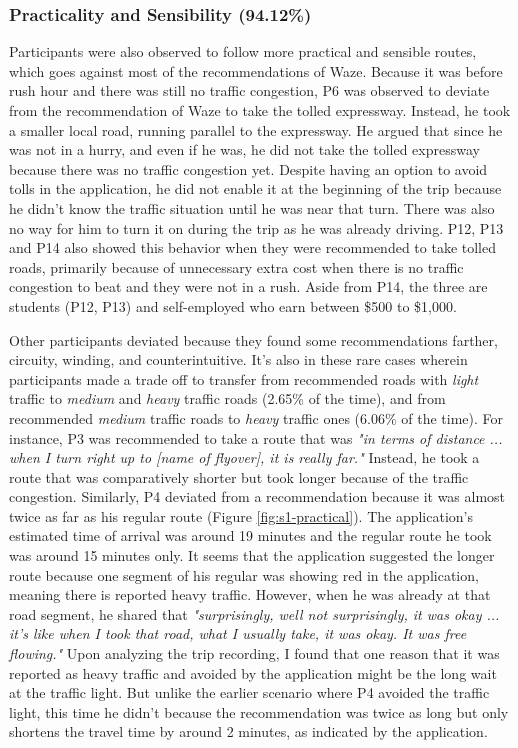 \subsubsection{Practicality and Sensibility (94.12\%)}
Participants were also observed to follow more practical and sensible routes, which goes against most of the recommendations of Waze. Because it was before rush hour and there was still no traffic congestion, P6 was observed to deviate from the recommendation of Waze to take the tolled expressway. Instead, he took a smaller local road, running parallel to the expressway. He argued that since he was not in a hurry, and even if he was, he did not take the tolled expressway because there was no traffic congestion yet. Despite having an option to avoid tolls in the application, he did not enable it at the beginning of the trip because he didn't know the traffic situation until he was near that turn. There was also no way for him to turn it on during the trip as he was already driving. P12, P13 and P14 also showed this behavior when they were recommended to take tolled roads, primarily because of unnecessary extra cost when there is no traffic congestion to beat and they were not in a rush. Aside from P14, the three are students (P12, P13) and self-employed who earn between \$500 to \$1,000.

Other participants deviated because they found some recommendations farther, circuity, winding, and counterintuitive. It's also in these rare cases wherein participants made a trade off to transfer from recommended roads with \emph{light} traffic to \emph{medium} and \emph{heavy} traffic roads (2.65\% of the time), and from recommended \emph{medium} traffic roads to \emph{heavy} traffic ones (6.06\% of the time). For instance, P3 was recommended to take a route that was \emph{"in terms of distance ... when I turn right up to [name of flyover], it is really far."} Instead, he took a route that was comparatively shorter but took longer because of the traffic congestion. Similarly, P4 deviated from a recommendation because it was almost twice as far as his regular route (Figure \ref{fig:s1-practical}). The application's estimated time of arrival was around 19 minutes and the regular route he took was around 15 minutes only. It seems that the application suggested the longer route because one segment of his regular was showing red in the application, meaning there is reported heavy traffic. However, when he was already at that road segment, he shared that \emph{"surprisingly, well not surprisingly, it was okay ... it's like when I took that road, what I usually take, it was okay. It was free flowing."} Upon analyzing the trip recording, I found that one reason that it was reported as heavy traffic and avoided by the application might be the long wait at the traffic light. But unlike the earlier scenario where P4 avoided the traffic light, this time he didn't because the recommendation was twice as long but only shortens the travel time by around 2 minutes, as indicated by the application. 

